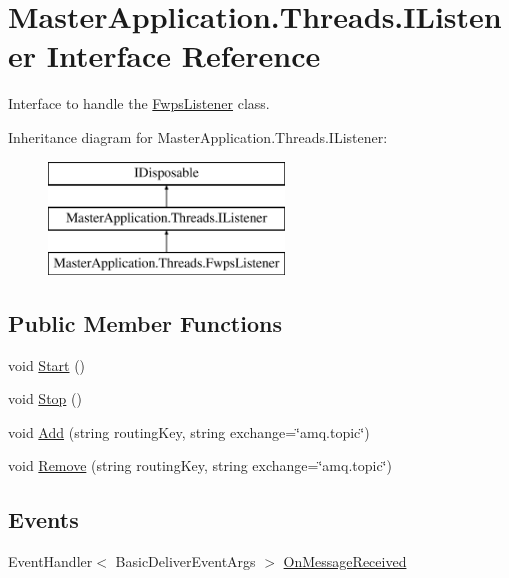 \hypertarget{interface_master_application_1_1_threads_1_1_i_listener}{}\section{Master\+Application.\+Threads.\+I\+Listener Interface Reference}
\label{interface_master_application_1_1_threads_1_1_i_listener}


Interface to handle the \mbox{\hyperlink{class_master_application_1_1_threads_1_1_fwps_listener}{Fwps\+Listener}} class.  


Inheritance diagram for Master\+Application.\+Threads.\+I\+Listener\+:\begin{figure}[H]
\begin{center}
\leavevmode
\includegraphics[height=3.000000cm]{interface_master_application_1_1_threads_1_1_i_listener}
\end{center}
\end{figure}
\subsection*{Public Member Functions}
\begin{DoxyCompactItemize}
\item 
void \mbox{\hyperlink{interface_master_application_1_1_threads_1_1_i_listener_ae413bfc6d77762470fa78203cd07271b}{Start}} ()
\item 
void \mbox{\hyperlink{interface_master_application_1_1_threads_1_1_i_listener_a0d9d8ecd623c0e30648053b64a7fc13a}{Stop}} ()
\item 
void \mbox{\hyperlink{interface_master_application_1_1_threads_1_1_i_listener_ae5d4878084f5003f98f99a5a3e4b5ec8}{Add}} (string routing\+Key, string exchange=\char`\"{}amq.\+topic\char`\"{})
\item 
void \mbox{\hyperlink{interface_master_application_1_1_threads_1_1_i_listener_a1bf04b1440221f92c0ba0f3f674d4bce}{Remove}} (string routing\+Key, string exchange=\char`\"{}amq.\+topic\char`\"{})
\end{DoxyCompactItemize}
\subsection*{Events}
\begin{DoxyCompactItemize}
\item 
Event\+Handler$<$ Basic\+Deliver\+Event\+Args $>$ \mbox{\hyperlink{interface_master_application_1_1_threads_1_1_i_listener_a1fa719996a24e3a7c60660e21e9d9d17}{On\+Message\+Received}}
\end{DoxyCompactItemize}


